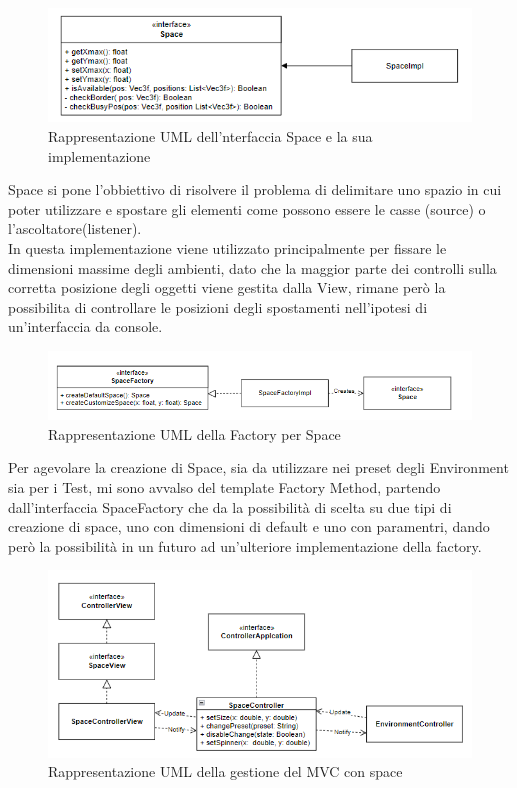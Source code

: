 \documentclass[a4paper,12pt]{report}
\begin{document}
\begin{figure}[H]
\centering{}
\includegraphics[width=\textwidth]{img/space/Space.png}
\caption{Rappresentazione UML dell'nterfaccia Space e la sua implementazione}
\label{img:space}
\end{figure}
Space si pone l'obbiettivo di risolvere il problema di delimitare uno spazio in cui poter utilizzare e spostare gli elementi come possono essere le casse (source) o l'ascoltatore(listener). \\In questa implementazione viene utilizzato principalmente per fissare le dimensioni massime degli ambienti, dato che la maggior parte dei controlli sulla corretta posizione degli oggetti viene gestita dalla View, rimane però la possibilita di controllare le posizioni degli spostamenti nell'ipotesi di un'interfaccia da console.
%
\begin{figure}[H]
\centering{}
\includegraphics[width=\textwidth]{img/space/SpaceFactory.png}
\caption{Rappresentazione UML della Factory per Space}
\label{img:spacefactory}
\end{figure}
Per agevolare la creazione di Space, sia da utilizzare nei preset degli Environment sia per i Test, mi sono avvalso del template Factory Method, partendo dall'interfaccia SpaceFactory che da la possibilità di scelta su due tipi di creazione di space, uno con dimensioni di default e uno con paramentri, dando però la possibilità in un futuro ad un'ulteriore implementazione della factory.
%
\begin{figure}[H]
\centering{}
\includegraphics[width=\textwidth]{img/space/SpaceMVC.png}
\caption{Rappresentazione UML della gestione del MVC con space}
\label{img:spacemvc}
\end{figure}
\end{document}
